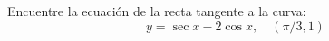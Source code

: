 \item Encuentre la ecuación de la recta tangente a la curva:
$$y = \sec x - 2 \cos x, \quad (\pi/3, 1)$$
